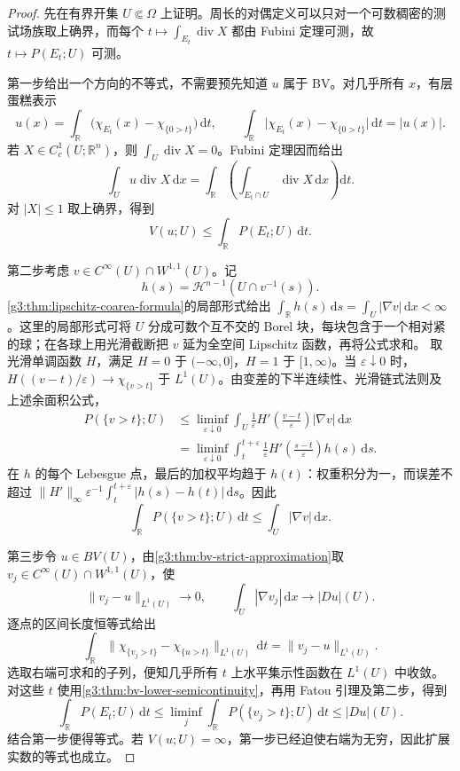 \begin{proof}
	先在有界开集 \(U\Subset\Omega\) 上证明。周长的对偶定义可以只对一个可数稠密的测试场族取上确界，而每个
	\(t\mapsto\int_{E_t}\operatorname{div}X\)
	都由 Fubini 定理可测，故 \(t\mapsto P(E_t;U)\) 可测。

	第一步给出一个方向的不等式，不需要预先知道 \(u\) 属于 BV。对几乎所有 \(x\)，有层蛋糕表示
	\[
		u(x)=\int_{\mathbb R}\bigl(\chi_{E_t}(x)-\chi_{\{0>t\}}\bigr)\,\mathrm dt,
		\qquad
		\int_{\mathbb R}\bigl|\chi_{E_t}(x)-\chi_{\{0>t\}}\bigr|\,\mathrm dt=|u(x)|.
	\]
	若 \(X\in C_c^1(U;\mathbb R^n)\)，则 \(\int_U\operatorname{div}X=0\)。Fubini 定理因而给出
	\[
		\int_Uu\operatorname{div}X\,\mathrm dx
		=\int_{\mathbb R}\left(\int_{E_t\cap U}\operatorname{div}X\,\mathrm dx\right)\mathrm dt.
	\]
	对 \(|X|\le1\) 取上确界，得到
	\begin{equation}\label{g3:eq:bv-coarea-dual-bound}
		V(u;U)\le\int_{\mathbb R}P(E_t;U)\,\mathrm dt.
	\end{equation}

	第二步考虑 \(v\in C^\infty(U)\cap W^{1,1}(U)\)。记
	\[
		h(s)=\mathcal H^{n-1}(U\cap v^{-1}(s)).
	\]
	\cref{g3:thm:lipschitz-coarea-formula}的局部形式给出
	\(\int_\mathbb Rh(s)\,\mathrm ds=\int_U|\nabla v|\,\mathrm dx<\infty\)。这里的局部形式可将 \(U\) 分成可数个互不交的 Borel 块，每块包含于一个相对紧的球；在各球上用光滑截断把 \(v\) 延为全空间 Lipschitz 函数，再将公式求和。
	取光滑单调函数 \(H\)，满足 \(H=0\) 于 \(( -\infty,0]\)，\(H=1\) 于 \([1,\infty)\)。当 \(\varepsilon\downarrow0\) 时，
	\(H((v-t)/\varepsilon)\to\chi_{\{v>t\}}\) 于 \(L^1(U)\)。由变差的下半连续性、光滑链式法则及上述余面积公式，
	\[
	\begin{aligned}
		P(\{v>t\};U)
		&\le\liminf_{\varepsilon\downarrow0}\int_U
		\frac1\varepsilon H'\!\left(\frac{v-t}{\varepsilon}\right)|\nabla v|\,\mathrm dx\\
		&=\liminf_{\varepsilon\downarrow0}\int_t^{t+\varepsilon}
		\frac1\varepsilon H'\!\left(\frac{s-t}{\varepsilon}\right)h(s)\,\mathrm ds.
	\end{aligned}
	\]
	在 \(h\) 的每个 Lebesgue 点，最后的加权平均趋于 \(h(t)\)：权重积分为一，而误差不超过
	\(\|H'\|_\infty\varepsilon^{-1}\int_t^{t+\varepsilon}|h(s)-h(t)|\,\mathrm ds\)。因此
	\[
		\int_{\mathbb R}P(\{v>t\};U)\,\mathrm dt
		\le\int_U|\nabla v|\,\mathrm dx.
	\]

	第三步令 \(u\in BV(U)\)，由\cref{g3:thm:bv-strict-approximation}取 \(v_j\in C^\infty(U)\cap W^{1,1}(U)\)，使
	\[
		\|v_j-u\|_{L^1(U)}\longrightarrow0,\qquad
		\int_U|\nabla v_j|\,\mathrm dx\longrightarrow|Du|(U).
	\]
	逐点的区间长度恒等式给出
	\[
		\int_{\mathbb R}\|\chi_{\{v_j>t\}}-\chi_{\{u>t\}}\|_{L^1(U)}\,\mathrm dt
		=\|v_j-u\|_{L^1(U)}.
	\]
	选取右端可求和的子列，便知几乎所有 \(t\) 上水平集示性函数在 \(L^1(U)\) 中收敛。对这些 \(t\) 使用\cref{g3:thm:bv-lower-semicontinuity}，再用 Fatou 引理及第二步，得到
	\[
		\int_{\mathbb R}P(E_t;U)\,\mathrm dt
		\le\liminf_j\int_{\mathbb R}P(\{v_j>t\};U)\,\mathrm dt
		\le|Du|(U).
	\]
	结合第一步便得等式。若 \(V(u;U)=\infty\)，第一步已经迫使右端为无穷，因此扩展实数的等式也成立。


\end{proof}

